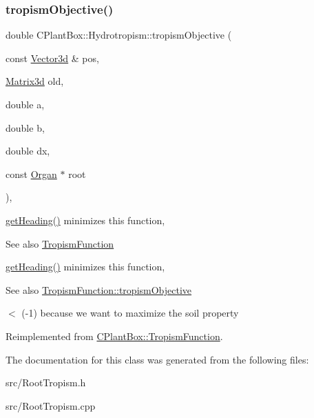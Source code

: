\subsubsection{\texorpdfstring{tropism\+Objective()}{tropismObjective()}}
{\footnotesize\ttfamily double C\+Plant\+Box\+::\+Hydrotropism\+::tropism\+Objective (\begin{DoxyParamCaption}\item[{const \hyperlink{classCPlantBox_1_1Vector3d}{Vector3d} \&}]{pos,  }\item[{\hyperlink{classCPlantBox_1_1Matrix3d}{Matrix3d}}]{old,  }\item[{double}]{a,  }\item[{double}]{b,  }\item[{double}]{dx,  }\item[{const \hyperlink{classCPlantBox_1_1Organ}{Organ} $\ast$}]{root }\end{DoxyParamCaption})\hspace{0.3cm}{\ttfamily [override]}, {\ttfamily [virtual]}}



\hyperlink{classCPlantBox_1_1TropismFunction_adb52b88734a94fe1365a00e02c7e6be5}{get\+Heading()} minimizes this function, 

\begin{DoxySeeAlso}{See also}
\hyperlink{classCPlantBox_1_1TropismFunction}{Tropism\+Function}
\end{DoxySeeAlso}
\hyperlink{classCPlantBox_1_1TropismFunction_adb52b88734a94fe1365a00e02c7e6be5}{get\+Heading()} minimizes this function, \begin{DoxySeeAlso}{See also}
\hyperlink{classCPlantBox_1_1TropismFunction_a4f2c79fff55d1398c98a070dd8ebbe08}{Tropism\+Function\+::tropism\+Objective} 
\end{DoxySeeAlso}
$<$ (-\/1) because we want to maximize the soil property 

Reimplemented from \hyperlink{classCPlantBox_1_1TropismFunction_a4f2c79fff55d1398c98a070dd8ebbe08}{C\+Plant\+Box\+::\+Tropism\+Function}.



The documentation for this class was generated from the following files\+:\begin{DoxyCompactItemize}
\item 
src/Root\+Tropism.\+h\item 
src/Root\+Tropism.\+cpp\end{DoxyCompactItemize}

